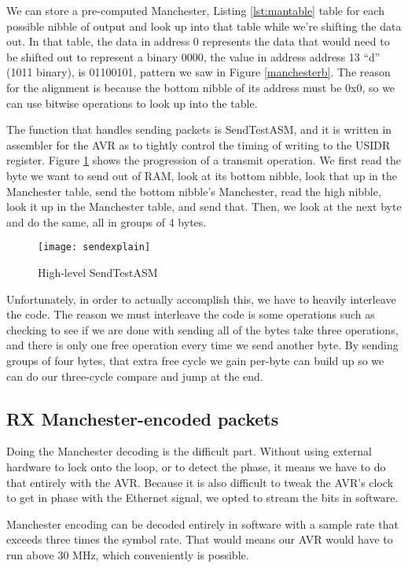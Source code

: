 \documentclass[13pt]{ltxdoc}
\begin{document}
We can store a pre-computed Manchester, Listing \ref{lst:mantable} table for each possible nibble of output
and look up into that table while we're shifting the data out.  In that table, the data in address
0 represents the data that would need to be shifted out to represent a binary 0000, the value in address
address 13 ``d'' (1011 binary), is 01100101, pattern we saw in Figure \ref{manchesterb}.  The reason for the alignment
is because the bottom nibble of its address must be 0x0, so we can use bitwise operations to look up
into the table.

The function that handles sending packets is SendTestASM, and it is written in assembler for the AVR as
to tightly control the timing of writing to the USIDR register.  Figure \ref{sendexplain} shows the progression
of a transmit operation. We first
read the byte we want to send out of RAM, look at its bottom nibble, look that up in the Manchester
table, send the bottom nibble's  Manchester, read the high nibble, look it up in the Manchester table, and
send that.  Then, we look at the next byte and do the same, all in groups of 4 bytes.

\begin{figure}
    \centering
    \texttt{[image: sendexplain]}
    \caption{High-level SendTestASM}
    \label{sendexplain}
\end{figure}

Unfortunately, in order to actually accomplish this, we have to heavily interleave the code.  The 
reason we must interleave the code is some operations such as checking to see if we are done with
sending all of the bytes take three operations, and there is only one free operation every time
we send another byte.  By sending groups of four bytes, that extra free cycle we gain per-byte can build up so we can
do our three-cycle compare and jump at the end.  

\subsection{RX Manchester-encoded packets}
\label{rxmch}
Doing the Manchester decoding is the difficult part.  Without using external hardware to lock onto
the loop, or to detect the phase, it means we have to do that entirely with the AVR.  Because it is
also difficult to tweak the AVR's clock to get in phase with the Ethernet signal, we opted to 
stream the bits in software.

Manchester encoding can be decoded entirely in software with a sample rate that exceeds three
times the symbol rate.  That would means our AVR would have to run above 30 MHz, which
conveniently is possible.
\end{document}
